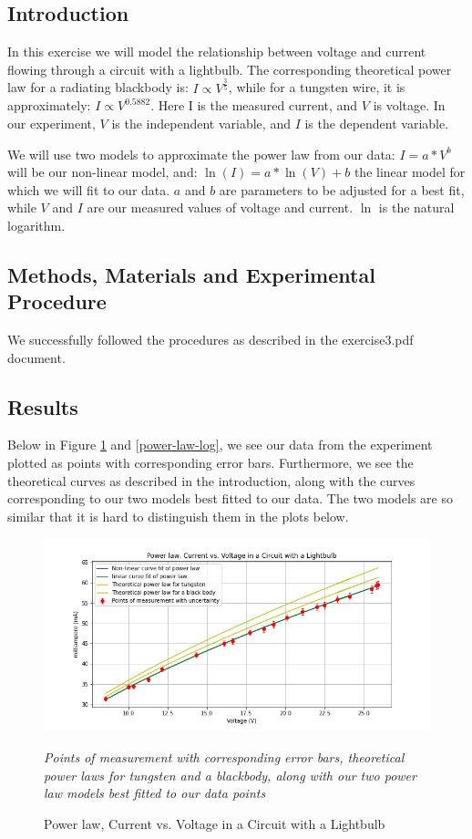 \documentclass[letterpaper,12pt]{article}
\begin{document}
\subsection{Introduction}

In this exercise we will model the relationship between voltage and current flowing 
through a circuit with a lightbulb. The corresponding theoretical power law for a 
radiating blackbody is: $I \propto V^{\frac{3}{5}}$, while for a tungsten wire, it is approximately: 
$I \propto V^{0.5882}$. Here I is the measured current, and $V$ is voltage. In our experiment, 
$V$ is the independent variable, and $I$ is the dependent variable. 

We will use two models to approximate the power law from our data: $I = a*V^b$ 
will be our non-linear model, and: $\ln(I) = a*\ln(V)+b$ the linear model for which 
we will fit to our data. $a$ and $b$ are parameters to be adjusted for a best fit, 
while $V$ and $I$ are our measured values of voltage and current. $\ln$ is the natural logarithm.

\subsection{Methods, Materials and Experimental Procedure}

We successfully followed the procedures as described in the exercise3.pdf document\cite{lab-manual-ex2}.

\subsection{Results}
Below in Figure \ref{power-law} and \ref{power-law-log}, we see our data from the experiment plotted as points with 
corresponding error bars. Furthermore, we see the theoretical curves as described in the introduction, 
along with the curves corresponding to our two models best fitted to our data. 
The two models are so similar that it is hard to distinguish them in the plots below.

\begin{figure}[H]
  \centering
  \includegraphics[width=0.95\linewidth]{../Exercise3/Power_law.png}    
  \begin{center}
    \emph{
    Points of measurement with corresponding error bars, theoretical power laws for 
  tungsten and a blackbody, along with our two power law models best fitted to our data 
  points}
  \end{center}
  \caption{Power law, Current vs. Voltage in a Circuit with a Lightbulb}
  \label{power-law}
\end{figure}
\end{document}
